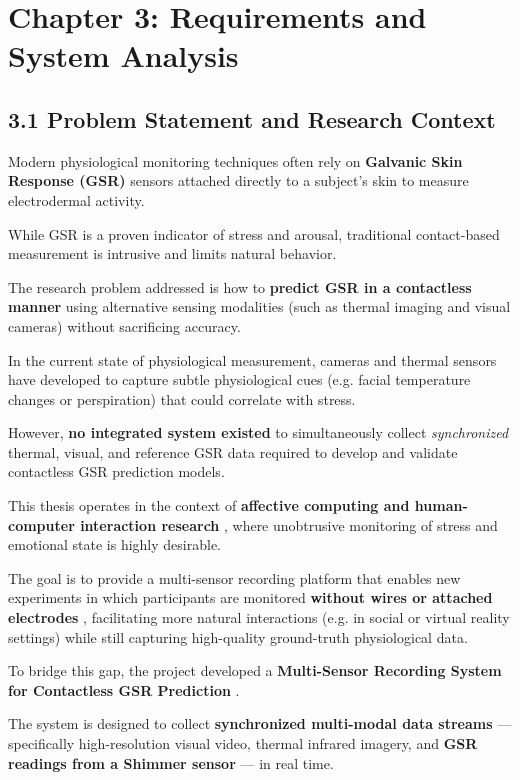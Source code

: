 \label{chap:3} \chapter{Chapter 3: Requirements and System Analysis}

 \section{3.1 Problem Statement and Research Context}

Modern physiological monitoring techniques often rely on \textbf{Galvanic Skin
Response (GSR)}
 sensors attached directly to a subject's skin to measure electrodermal activity.

While GSR is a proven indicator of stress and arousal, traditional contact-based
measurement is intrusive and limits natural behavior.

The research problem addressed is how to \textbf{predict GSR in a contactless manner}
 using alternative sensing modalities (such as thermal imaging and visual cameras)
 without sacrificing accuracy.

In the current state of physiological measurement, cameras and thermal sensors have
developed to capture subtle physiological cues (e.g.  facial temperature changes or
perspiration) that could correlate with stress.

However, \textbf{no integrated system existed}
 to simultaneously collect \textit{synchronized} thermal, visual, and reference GSR
 data required to develop and validate contactless GSR prediction models.

This thesis operates in the context of \textbf{affective computing and human-computer
interaction research}
, where unobtrusive monitoring of stress and emotional state is highly desirable.

The goal is to provide a multi-sensor recording platform that enables new experiments
in which participants are monitored \textbf{without wires or attached electrodes}
, facilitating more natural interactions (e.g.  in social or virtual reality
settings) while still capturing high-quality ground-truth physiological data.

To bridge this gap, the project developed a \textbf{Multi-Sensor Recording System for
Contactless GSR Prediction}
.

The system is designed to collect \textbf{synchronized multi-modal data streams}
 --- specifically high-resolution visual video, thermal infrared imagery, and
 \textbf{GSR readings from a Shimmer sensor}
 --- in real time.

